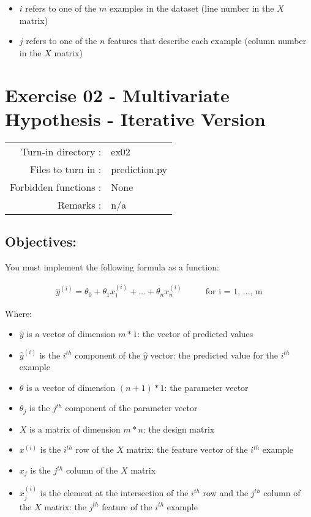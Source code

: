 \documentclass[]{article}
\begin{document}
\begin{itemize}
\item
  \(i\) refers to one of the \(m\) examples in the dataset (line number
  in the \(X\) matrix)
\item
  \(j\) refers to one of the \(n\) features that describe each example
  (column number in the \(X\) matrix)
\end{itemize}

\clearpage

\hypertarget{exercise-02---multivariate-hypothesis---iterative-version-1}{%
\section{Exercise 02 - Multivariate Hypothesis - Iterative
Version}\label{exercise-02---multivariate-hypothesis---iterative-version-1}}

\begin{longtable}[]{@{}rl@{}}
\toprule
\endhead
Turn-in directory : & ex02\tabularnewline
Files to turn in : & prediction.py\tabularnewline
Forbidden functions : & None\tabularnewline
Remarks : & n/a\tabularnewline
\bottomrule
\end{longtable}

\hypertarget{objectives-1}{%
\subsection{Objectives:}\label{objectives-1}}

You must implement the following formula as a function:

\large

\[
\begin{matrix}
  \hat{y}^{(i)} = \theta_0 + \theta_1 x_{1}^{(i)}  + \dots + \theta_n x_{n}^{(i)} && & \text{ for i = 1, ..., m}
\end{matrix}
\] \normalsize

Where:

\begin{itemize}
\item
  \(\hat{y}\) is a vector of dimension \(m * 1\): the vector of
  predicted values
\item
  \(\hat{y}^{(i)}\) is the \(i^{th}\) component of the \(\hat{y}\)
  vector: the predicted value for the \(i^{th}\) example
\item
  \(\theta\) is a vector of dimension \((n + 1) * 1\): the parameter
  vector
\item
  \(\theta_j\) is the \(j^{th}\) component of the parameter vector
\item
  \(X\) is a matrix of dimension \(m * n\): the design matrix
\item
  \(x^{(i)}\) is the \(i^{th}\) row of the \(X\) matrix: the feature
  vector of the \(i^{th}\) example
\item
  \(x_{j}\) is the \(j^{th}\) column of the \(X\) matrix
\item
  \(x_j^{(i)}\) is the element at the intersection of the \(i^{th}\) row
  and the \(j^{th}\) column of the \(X\) matrix: the \(j^{th}\) feature
  of the \(i^{th}\) example
\end{itemize}
\end{document}
